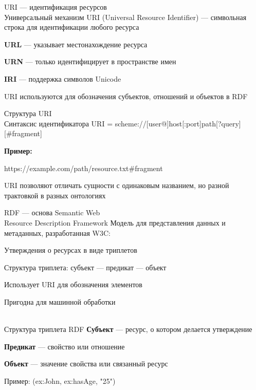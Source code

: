 \begin{frame}{URI --- идентификация ресурсов\\Универсальный механизм}
	\topline
	\justifying
	URI (Universal Resource Identifier) --- символьная строка для идентификации любого ресурса
	
	\begin{textitemize}
		\item \textbf{URL} --- указывает местонахождение ресурса
		\item \textbf{URN} --- только идентифицирует в пространстве имен
		\item \textbf{IRI} --- поддержка символов Unicode
	\end{textitemize}
	
	URI используются для обозначения субъектов, отношений и объектов в RDF
\end{frame}

\begin{frame}{Структура URI\\Синтаксис идентификатора}
	\topline
	\justifying
	URI = scheme://[user@]host[:port]path[?query][\#fragment]
	
	\vspace{0.5cm}
	\textbf{Пример:}
	
	https://example.com/path/resource.txt\#fragment
	
	\vspace{0.5cm}
	URI позволяют отличать сущности с одинаковым названием, но разной трактовкой в разных онтологиях
\end{frame}

\begin{frame}{RDF --- основа Semantic Web\\Resource Description Framework}
	\topline
	\justifying
	Модель для представления данных и метаданных, разработанная W3C:
	\begin{textitemize}
		\item Утверждения о ресурсах в виде триплетов
		\item Структура триплета: субъект --- предикат --- объект
		\item Использует URI для обозначения элементов
		\item Пригодна для машинной обработки
	\end{textitemize}
\end{frame}

\begin{frame}{\\Структура триплета RDF}
	\topline
	\justifying
	\textbf{Субъект} --- ресурс, о котором делается утверждение
	
	\textbf{Предикат} --- свойство или отношение
	
	\textbf{Объект} --- значение свойства или связанный ресурс
	
	\vspace{0.5cm}
	Пример: (ex:John, ex:hasAge, "25")
\end{frame}

